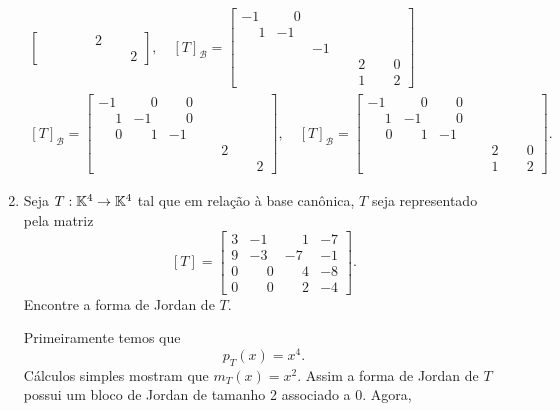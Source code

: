 \begin{exemplo}
\begin{enumerate}[label={\arabic*})]
\begin{solucao}
\begin{align*}
\begin{bmatrix}
					& & & \phantom{-}2 & \\
					& & & & \phantom{-}2
				\end{bmatrix}, \quad [T]_\mathcal{B} = \begin{bmatrix}
					-1 & \phantom{-}0 & & &\\
					\phantom{-}1 & -1 & & & \\
					\phantom{-1} &  & -1 & &\\
					& & & \phantom{-}2 & \phantom{-}0\\
					& & & \phantom{-}1 & \phantom{-}2
				\end{bmatrix}\\
				[T]_\mathcal{B} = \begin{bmatrix}
					-1 & \phantom{-}0 & \phantom{-}0 & &\\
					\phantom{-}1 & -1 & \phantom{-}0 & & \\
					\phantom{-} 0 & \phantom{-}1 & -1 & &\\
					& & & \phantom{-}2 & \\
					& & & & \phantom{-}2
				\end{bmatrix}, \quad [T]_\mathcal{B} = \begin{bmatrix}
					-1 & \phantom{-}0 & \phantom{-}0 & &\\
					\phantom{-}1 & -1 & \phantom{-}0 & & \\
					\phantom{-1}0 & \phantom{-}1 & -1 & &\\
					& & & \phantom{-}2 & \phantom{-}0\\
					& & & \phantom{-}1 & \phantom{-}2
				\end{bmatrix}.
			\end{align*}
		\end{solucao}
		\item Seja $T : \mathbb{K}^4 \to \mathbb{K}^4$ tal que em rela\c{c}\~ao \`a base can\^onica, $T$ seja representado pela matriz
		\[
			[T] = \begin{bmatrix}
				3 & -1 & \phantom{-}1 & -7\\
				9 & -3 & -7 & -1\\
				0 & \phantom{-}0 & \phantom{-}4 & -8\\
				0 & \phantom{-}0 & \phantom{-}2 & -4
			\end{bmatrix}.
		\]
		Encontre a forma de Jordan de $T$.
		\begin{solucao}
			Primeiramente temos que
			\[
				p_T(x) = x^4.
			\]
			C\'alculos simples mostram que $m_T(x) = x^2$. Assim a forma de Jordan de $T$ possui um bloco de Jordan de tamanho 2 associado a 0. Agora,

\end{solucao}
\end{enumerate}
\end{exemplo}
